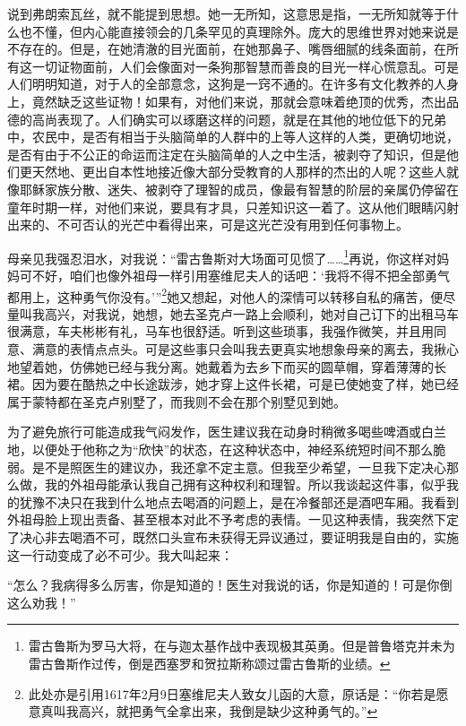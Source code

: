 \par 说到弗朗索瓦丝，就不能提到思想。她一无所知，这意思是指，一无所知就等于什么也不懂，但内心能直接领会的几条罕见的真理除外。庞大的思维世界对她来说是不存在的。但是，在她清澈的目光面前，在她那鼻子、嘴唇细腻的线条面前，在所有这一切证物面前，人们会像面对一条狗那智慧而善良的目光一样心慌意乱。可是人们明明知道，对于人的全部意念，这狗是一窍不通的。在许多有文化教养的人身上，竟然缺乏这些证物！如果有，对他们来说，那就会意味着绝顶的优秀，杰出品德的高尚表现了。人们确实可以琢磨这样的问题，就是在其他的地位低下的兄弟中，农民中，是否有相当于头脑简单的人群中的上等人这样的人类，更确切地说，是否有由于不公正的命运而注定在头脑简单的人之中生活，被剥夺了知识，但是他们更天然地、更出自本性地接近像大部分受教育的人那样的杰出的人呢？这些人就像耶稣家族分散、迷失、被剥夺了理智的成员，像最有智慧的阶层的亲属仍停留在童年时期一样，对他们来说，要具有才具，只差知识这一着了。这从他们眼睛闪射出来的、不可否认的光芒中看得出来，可是这光芒没有用到任何事物上。
\par 母亲见我强忍泪水，对我说：“雷古鲁斯对大场面可见惯了……\footnote{雷古鲁斯为罗马大将，在与迦太基作战中表现极其英勇。但是普鲁塔克并未为雷古鲁斯作过传，倒是西塞罗和贺拉斯称颂过雷古鲁斯的业绩。}再说，你这样对妈妈可不好，咱们也像外祖母一样引用塞维尼夫人的话吧：‘我将不得不把全部勇气都用上，这种勇气你没有。’”\footnote{此处亦是引用1617年2月9日塞维尼夫人致女儿函的大意，原话是：“你若是愿意真叫我高兴，就把勇气全拿出来，我倒是缺少这种勇气的。”}她又想起，对他人的深情可以转移自私的痛苦，便尽量叫我高兴，对我说，她想，她去圣克卢一路上会顺利，她对自己订下的出租马车很满意，车夫彬彬有礼，马车也很舒适。听到这些琐事，我强作微笑，并且用同意、满意的表情点点头。可是这些事只会叫我去更真实地想象母亲的离去，我揪心地望着她，仿佛她已经与我分离。她戴着为去乡下而买的圆草帽，穿着薄薄的长裙。因为要在酷热之中长途跋涉，她才穿上这件长裙，可是已使她变了样，她已经属于蒙特都在圣克卢别墅了，而我则不会在那个别墅见到她。
\par 为了避免旅行可能造成我气闷发作，医生建议我在动身时稍微多喝些啤酒或白兰地，以便处于他称之为“欣快”的状态，在这种状态中，神经系统短时间不那么脆弱。是不是照医生的建议办，我还拿不定主意。但我至少希望，一旦我下定决心那么做，我的外祖母能承认我自己拥有这种权利和理智。所以我谈起这件事，似乎我的犹豫不决只在我到什么地点去喝酒的问题上，是在冷餐部还是酒吧车厢。我看到外祖母脸上现出责备、甚至根本对此不予考虑的表情。一见这种表情，我突然下定了决心非去喝酒不可，既然口头宣布未获得无异议通过，要证明我是自由的，实施这一行动变成了必不可少。我大叫起来：
\par “怎么？我病得多么厉害，你是知道的！医生对我说的话，你是知道的！可是你倒这么劝我！”
